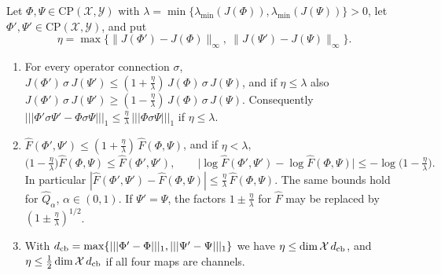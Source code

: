 \begin{theorem}\label{cont:thm:choi floor}
Let $\Phi,\Psi\in\mathrm{CP}(\mathcal{X},\mathcal{Y})$ with $\lambda=\min\{\lambda_{\min}(J(\Phi)),\lambda_{\min}(J(\Psi))\}>0$, let $\Phi',\Psi'\in\mathrm{CP}(\mathcal{X},\mathcal{Y})$, and put
\[
\eta=\max\big\{\|J(\Phi')-J(\Phi)\|_\infty,\ \|J(\Psi')-J(\Psi)\|_\infty\big\}.
\]
\begin{enumerate}
\item[(a)] For every operator connection $\sigma$, $J(\Phi')\,\sigma\,J(\Psi')\leq(1+\frac\eta\lambda)\,J(\Phi)\,\sigma\,J(\Psi)$, and if $\eta\leq\lambda$ also $J(\Phi')\,\sigma\,J(\Psi')\geq(1-\frac\eta\lambda)\,J(\Phi)\,\sigma\,J(\Psi)$. Consequently $|||\Phi'\sigma\Psi'-\Phi\sigma\Psi|||_1\leq\frac\eta\lambda\,|||\Phi\sigma\Psi|||_1$ if $\eta\leq\lambda$.
\item[(b)] $\widehat{F}(\Phi',\Psi')\leq(1+\frac\eta\lambda)\,\widehat{F}(\Phi,\Psi)$, and if $\eta<\lambda$,
\[
\big(1-\tfrac\eta\lambda\big)\widehat{F}(\Phi,\Psi)\leq\widehat{F}(\Phi',\Psi'),\qquad\big|\log\widehat{F}(\Phi',\Psi')-\log\widehat{F}(\Phi,\Psi)\big|\leq-\log\big(1-\tfrac\eta\lambda\big).
\]
In particular $|\widehat{F}(\Phi',\Psi')-\widehat{F}(\Phi,\Psi)|\leq\frac\eta\lambda\,\widehat{F}(\Phi,\Psi)$. The same bounds hold for $\widehat{Q}_\alpha$, $\alpha\in(0,1)$. If $\Psi'=\Psi$, the factors $1\pm\frac\eta\lambda$ for $\widehat{F}$ may be replaced by $(1\pm\frac\eta\lambda)^{1/2}$.
\item[(c)] With $d_{\rm cb}=\max\{|||\Phi'-\Phi|||_1,|||\Psi'-\Psi|||_1\}$ we have $\eta\leq\dim\mathcal{X}\,d_{\rm cb}$, and $\eta\leq\frac12\dim\mathcal{X}\,d_{\rm cb}$ if all four maps are channels.
\end{enumerate}
\end{theorem}

